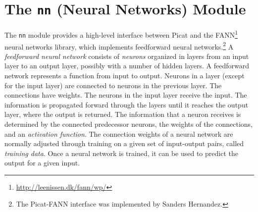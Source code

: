 
\chapter{\label{chapter:nn}The \texttt{nn} (Neural Networks) Module}

The \texttt{nn} module provides a high-level interface between Picat and the FANN\footnote{\url{http://leenissen.dk/fann/wp/}} neural networks library, which implements feedforward neural networks.\footnote{The Picat-FANN interface was implemented by Sanders Hernandez.}  A \emph{feedforward neural network} consists of \emph{neurons} organized in layers from an input layer to an output layer, possibly with a number of hidden layers. A feedforward network represents a function from input to output. Neurons in a layer (except for the input layer) are connected to neurons in the previous layer. The connections have weights.  The neurons in the input layer receive the input. The information is propagated forward through the layers until it reaches the output layer, where the output is returned. The information that a neuron receives is determined by the connected predecessor neurons, the weights of the connections, and an \emph{activation function}. The connection weights of a neural network are normally adjusted through training on a given set of input-output pairs, called \emph{training data}. Once a neural network is trained, it can be used to predict the output for a given input.

